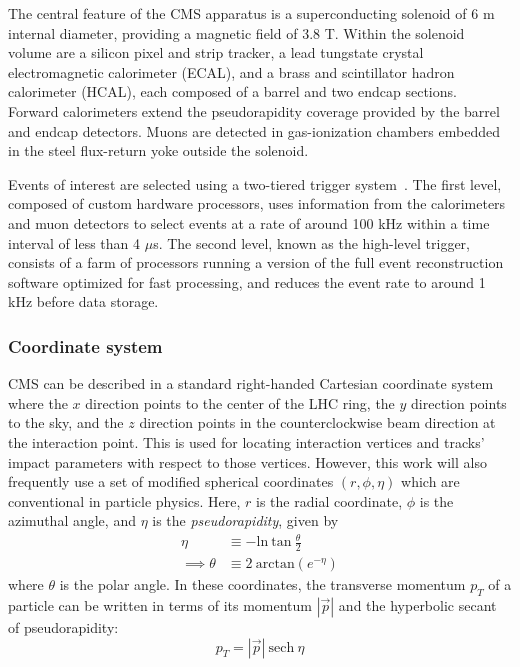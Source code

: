 The central feature of the CMS apparatus is a superconducting solenoid of 6 m internal diameter, providing a magnetic field of 3.8 T.
Within the solenoid volume are a silicon pixel and strip tracker, a lead tungstate crystal electromagnetic calorimeter (ECAL), and a brass and scintillator hadron calorimeter (HCAL), each composed of a barrel and two endcap sections. 
Forward calorimeters extend the pseudorapidity coverage provided by the barrel and endcap detectors. 
Muons are detected in gas-ionization chambers embedded in the steel flux-return yoke outside the solenoid.

Events of interest are selected using a two-tiered trigger system~\cite{Khachatryan:2016bia}.
The first level, composed of custom hardware processors, uses information from the calorimeters and muon detectors to select events at a rate of around 100 kHz within a time interval of less than 4 $\mu$s.
The second level, known as the high-level trigger, consists of a farm of processors running a version of the full event reconstruction software optimized for fast processing, and reduces the event rate to around 1 kHz before data storage.

\subsubsection{Coordinate system}
CMS can be described in a standard right-handed Cartesian coordinate system where 
the $x$ direction points to the center of the LHC ring, 
the $y$ direction points to the sky,
and the $z$ direction points in the counterclockwise beam direction at the interaction point.
This is used for locating interaction vertices and tracks' impact parameters with respect to those vertices.
However, this work will also frequently use a set of modified spherical coordinates $(r,\phi,\eta)$
which are conventional in particle physics.
Here, $r$ is the radial coordinate, $\phi$ is the azimuthal angle, and $\eta$ is the \textit{pseudorapidity}, given by
\begin{equation}
\begin{split}
\eta   & \equiv {-} \mathrm{ln}\:\mathrm{tan}\:\frac{\theta}{2} \\
\implies \theta & \equiv 2\:\mathrm{arctan} \left(e^{-\eta}\right)
\label{eq:eta}
\end{split}
\end{equation}
where $\theta$ is the polar angle. 
In these coordinates, the transverse momentum $p_T$ of a particle can be written in terms of its momentum $|\vec{p}|$ and the hyperbolic secant of pseudorapidity:
\begin{equation}
p_T = |\vec{p}|~\mathrm{sech}~\eta
\end{equation}

